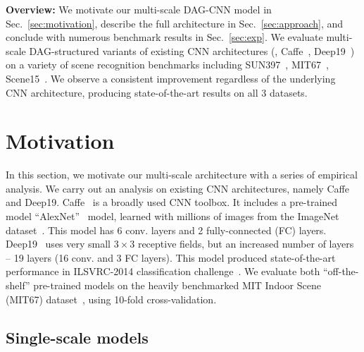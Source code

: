 \documentclass[10pt,twocolumn,letterpaper]{article}
\begin{document}
{\bf Overview:} We motivate our multi-scale DAG-CNN model in Sec.~\ref{sec:motivation}, describe the full architecture in Sec.~\ref{sec:approach}, and conclude with numerous benchmark results in Sec.~\ref{sec:exp}. We evaluate multi-scale DAG-structured variants of existing CNN architectures (\eg, Caffe~\cite{Caffe}, Deep19~\cite{veryDeep}) on a variety of scene recognition benchmarks including SUN397~\cite{SUN397}, MIT67~\cite{MIT67}, Scene15~\cite{Scene15}. We observe a consistent improvement regardless of the underlying CNN architecture, producing state-of-the-art results on all 3 datasets.



\section{Motivation\label{sec:motivation}}

In this section, we motivate our multi-scale architecture with a series of empirical analysis. We carry out an analysis on existing CNN architectures, namely Caffe and Deep19. Caffe~\cite{Caffe} is a broadly used CNN toolbox. It includes a pre-trained model ``AlexNet''~\cite{AlexNet} model, learned with millions of images from the ImageNet dataset~\cite{ImageNet}. This model has 6 conv. layers and 2 fully-connected (FC) layers. Deep19~\cite{veryDeep} uses very small $3\times 3$ receptive fields, but an increased number of layers -- 19 layers (16 conv. and 3 FC layers). This model produced state-of-the-art performance in ILSVRC-2014 classification challenge~\cite{ILSVRC14}. We evaluate both ``off-the-shelf'' pre-trained models on the heavily benchmarked MIT Indoor Scene (MIT67) dataset~\cite{MIT67}, using 10-fold cross-validation.

\subsection{Single-scale models} 
\end{document}
